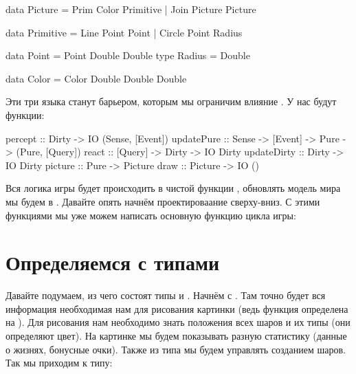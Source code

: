 \begin{code}
data Picture = Prim Color Primitive
             | Join Picture Picture

data Primitive = Line Point Point | Circle Point Radius

data Point  = Point Double Double
type Radius = Double   

data Color = Color Double Double Double
\end{code}

Эти три языка станут барьером, которым мы ограничим влияние . У
нас будут функции:


\begin{code}
percept     :: Dirty -> IO (Sense, [Event])
updatePure  :: Sense -> [Event] -> Pure -> (Pure, [Query])
react       :: [Query] -> Dirty -> IO Dirty
updateDirty :: Dirty -> IO Dirty
picture     :: Pure -> Picture
draw        :: Picture -> IO ()
\end{code}

Вся логика игры будет происходить в чистой функции ,
обновлять модель мира мы будем в . Давайте опять начнём
проектироваание сверху-вниз. С этими функциями мы уже можем написать
основную функцию цикла игры:



\section{Определяемся с типами}

Давайте подумаем, из чего состоят типы  и . Начнём с
. Там точно будет вся информация необходимая нам для рисования
картинки (ведь функция  определена на ). Для
рисования нам необходимо знать положения всех шаров и их типы (они
определяют цвет). На картинке мы будем показывать разную статистику
(данные о жизнях, бонусные очки). Также из типа  мы будем
управлять созданием шаров. Так мы приходим к типу:


